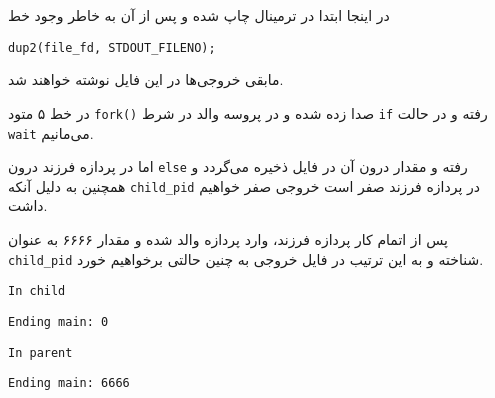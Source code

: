 در اینجا ابتدا در ترمینال 
چاپ شده و پس از آن به خاطر وجود خط

\LTR
\verb|dup2(file_fd, STDOUT_FILENO);|
\RTL

مابقی خروجی‌ها در این فایل نوشته خواهند شد.

در خط ۵ متود
\verb|fork()|
صدا زده شده و در پروسه والد در شرط
\verb|if|
رفته و در حالت 
\verb|wait|
می‌مانیم.

اما در پردازه فرزند درون
\verb|else|
رفته و مقدار درون آن در فایل ذخیره می‌گردد و همچنین به دلیل آنکه
\verb|child_pid|
در پردازه فرزند صفر است خروجی صفر خواهیم داشت.

پس از اتمام کار پردازه فرزند، وارد پردازه والد شده و مقدار
۶۶۶۶
به عنوان
\verb|child_pid|
شناخته و به این ترتیب در فایل خروجی به چنین حالتی برخواهیم خورد.

\LTR
\begin{center}
    \verb|In child|

    \verb|Ending main: 0|

    \verb|In parent|

    \verb|Ending main: 6666|
\end{center}
\RTL